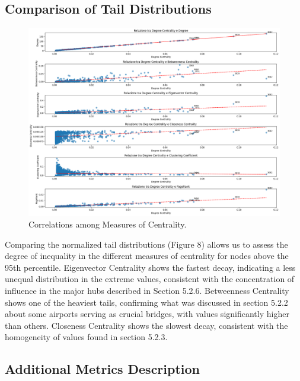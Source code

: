 \documentclass[12pt]{article}
\begin{document}
    \subsection{Comparison of Tail Distributions}
    \begin{figure}[H]
        \centering
        \includegraphics[width=0.8\linewidth]{img/tail_distribution.png}
        \caption{Correlations among Measures of Centrality.}
    \end{figure}
    Comparing the normalized tail distributions (Figure 8) allows us to assess the degree of inequality in the different measures of centrality for nodes above the 95th percentile.
    Eigenvector Centrality shows the fastest decay, indicating a less unequal distribution in the extreme values, consistent with the concentration of influence in the major hubs described in Section 5.2.6.
    Betweenness Centrality shows one of the heaviest tails, confirming what was discussed in section 5.2.2 about some airports serving as crucial bridges, with values significantly higher than others.
    Closeness Centrality shows the slowest decay, consistent with the homogeneity of values found in section 5.2.3.

    \subsection{Additional Metrics Description}\label{subsec:additional-metrics-description}
\end{document}
